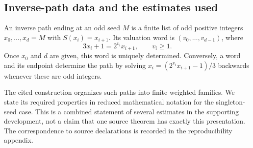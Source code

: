 \documentclass[11pt]{article}
\begin{document}
\subsection{Inverse-path data and the estimates used}
An inverse path ending at an odd seed $M$ is a finite list of odd positive
integers $x_0,\ldots,x_d=M$ with $S(x_i)=x_{i+1}$.
Its valuation word is $(v_0,\ldots,v_{d-1})$, where
\[
 3x_i+1=2^{v_i}x_{i+1},\qquad v_i\ge1.
\]
Once $x_0$ and $d$ are given, this word is uniquely determined.
Conversely, a word and its endpoint determine the path by solving
$x_i=(2^{v_i}x_{i+1}-1)/3$ backwards whenever these are odd integers.

The cited construction organizes such paths into finite weighted families.
We state its required properties in reduced mathematical notation for
the singleton-seed case. This is a combined statement of several estimates
in the supporting development, not a claim that one source theorem has
exactly this presentation. The correspondence to source declarations is
recorded in the reproducibility appendix.
\end{document}
